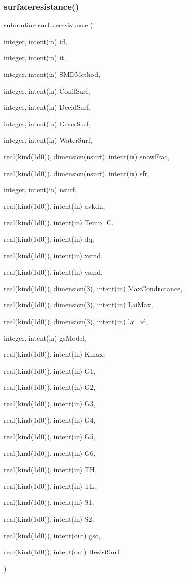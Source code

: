 \subsubsection{\texorpdfstring{surfaceresistance()}{surfaceresistance()}}
{\footnotesize\ttfamily subroutine surfaceresistance (\begin{DoxyParamCaption}\item[{integer, intent(in)}]{id,  }\item[{integer, intent(in)}]{it,  }\item[{integer, intent(in)}]{S\+M\+D\+Method,  }\item[{integer, intent(in)}]{Conif\+Surf,  }\item[{integer, intent(in)}]{Decid\+Surf,  }\item[{integer, intent(in)}]{Grass\+Surf,  }\item[{integer, intent(in)}]{Water\+Surf,  }\item[{real(kind(1d0)), dimension(nsurf), intent(in)}]{snow\+Frac,  }\item[{real(kind(1d0)), dimension(nsurf), intent(in)}]{sfr,  }\item[{integer, intent(in)}]{nsurf,  }\item[{real(kind(1d0)), intent(in)}]{avkdn,  }\item[{real(kind(1d0)), intent(in)}]{Temp\+\_\+C,  }\item[{real(kind(1d0)), intent(in)}]{dq,  }\item[{real(kind(1d0)), intent(in)}]{xsmd,  }\item[{real(kind(1d0)), intent(in)}]{vsmd,  }\item[{real(kind(1d0)), dimension(3), intent(in)}]{Max\+Conductance,  }\item[{real(kind(1d0)), dimension(3), intent(in)}]{Lai\+Max,  }\item[{real(kind(1d0)), dimension(3), intent(in)}]{lai\+\_\+id,  }\item[{integer, intent(in)}]{gs\+Model,  }\item[{real(kind(1d0)), intent(in)}]{Kmax,  }\item[{real(kind(1d0)), intent(in)}]{G1,  }\item[{real(kind(1d0)), intent(in)}]{G2,  }\item[{real(kind(1d0)), intent(in)}]{G3,  }\item[{real(kind(1d0)), intent(in)}]{G4,  }\item[{real(kind(1d0)), intent(in)}]{G5,  }\item[{real(kind(1d0)), intent(in)}]{G6,  }\item[{real(kind(1d0)), intent(in)}]{TH,  }\item[{real(kind(1d0)), intent(in)}]{TL,  }\item[{real(kind(1d0)), intent(in)}]{S1,  }\item[{real(kind(1d0)), intent(in)}]{S2,  }\item[{real(kind(1d0)), intent(out)}]{gsc,  }\item[{real(kind(1d0)), intent(out)}]{Resist\+Surf }\end{DoxyParamCaption})}



